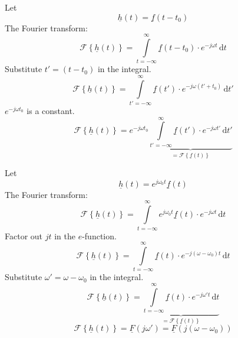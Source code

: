 \begin{solution}
	\begin{tasks}
		\task
		Let
		\begin{equation*}
			\underline{h}(t) = \underline{f}(t - t_0)
		\end{equation*}
		The Fourier transform:
		\begin{equation*}
			\mathcal{F}\left\{\underline{h}(t)\right\} = \int\limits_{t = -\infty}^{\infty} \underline{f}(t - t_0) \cdot e^{-j \omega t} \, \mathrm{d} t
		\end{equation*}
		Substitute $t' = (t - t_0)$ in the integral.
		\begin{equation*}
			\mathcal{F}\left\{\underline{h}(t)\right\} = \int\limits_{t' = -\infty}^{\infty} \underline{f}(t') \cdot e^{-j \omega (t' + t_0)} \, \mathrm{d} t'
		\end{equation*}
		$e^{-j \omega t_0}$ is a constant.
		\begin{equation*}
			\mathcal{F}\left\{\underline{h}(t)\right\} = e^{-j \omega t_0} \underbrace{\int\limits_{t' = -\infty}^{\infty} \underline{f}(t') \cdot e^{-j \omega t'} \, \mathrm{d} t'}_{= \mathcal{F}\left\{\underline{f}(t)\right\} }
		\end{equation*}
		
		\task
		Let
		\begin{equation*}
			\underline{h}(t) = e^{j \omega_0 t} \underline{f}(t)
		\end{equation*}
		The Fourier transform:
		\begin{equation*}
			\mathcal{F}\left\{\underline{h}(t)\right\} = \int\limits_{t = -\infty}^{\infty} e^{j \omega_0 t} \underline{f}(t) \cdot e^{-j \omega t} \, \mathrm{d} t
		\end{equation*}
		Factor out $j t$ in the $e$-function.
		\begin{equation*}
			\mathcal{F}\left\{\underline{h}(t)\right\} = \int\limits_{t = -\infty}^{\infty} \underline{f}(t) \cdot e^{-j (\omega - \omega_0) t} \, \mathrm{d} t
		\end{equation*}
		Substitute $\omega' = \omega - \omega_0$ in the integral.
		\begin{equation*}
			\mathcal{F}\left\{\underline{h}(t)\right\} = \underbrace{\int\limits_{t = -\infty}^{\infty} \underline{f}(t) \cdot e^{-j \omega' t} \, \mathrm{d} t}_{= \mathcal{F}\left\{\underline{f}(t)\right\}}
		\end{equation*}
		\begin{equation*}
			\mathcal{F}\left\{\underline{h}(t)\right\} = \underline{F}\left(j \omega' \right) = \underline{F}\left(j \left(\omega - \omega_0\right) \right)
		\end{equation*}
		

\end{tasks}
\end{solution}
